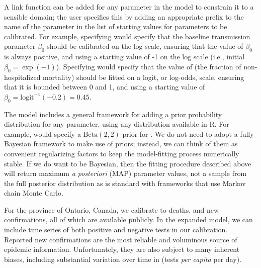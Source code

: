 \documentclass[12pt]{article}\usepackage[]{graphicx}\usepackage[]{color}
\begin{document}
A link function can be added for any parameter in the model to constrain it to a sensible domain; the user specifies this by adding an appropriate prefix to the name of the parameter in the list of starting values for parameters to be calibrated. 
For example, specifying  would specify that the baseline transmission parameter $\beta_0$ should be calibrated on the log scale, ensuring that the value of $\beta_0$ is always positive, and using a starting value of -1 on the log scale (i.e., initial $\beta_0 = \exp(-1)$). 
Specifying  would specify that the value of  (the fraction of non-hospitalized mortality) should be fitted on a logit, or log-odds, scale, ensuring that it is bounded between 0 and 1, and using a starting value of $\beta_0 = \textrm{logit}^{-1}(-0.2) = 0.45$.

The model includes a general framework for adding a prior probability distribution for any parameter, using any distribution available in R. 
For example,  would specify a $\textrm{Beta}(2,2)$ prior for .
We do not need to adopt a fully Bayesian framework to make use of priors; instead, we can think of them as convenient regularizing factors to keep the model-fitting process numerically stable. If we do want to be Bayesian, then the fitting procedure described above will return maximum \emph{a posteriori} (MAP) parameter values, not a sample from the full posterior distribution as is standard with frameworks that use Markov chain Monte Carlo.

For the province of Ontario, Canada,
we calibrate to deaths, and new confirmations, all of which are available publicly. 
In the expanded model, we can include time series of both positive and negative tests in our calibration. 
Reported new confirmations are the most reliable and voluminous source of epidemic information.
Unfortunately, they are also subject to many inherent biases, including substantial variation over time in  (\ie tests \emph{per capita} per day).
\end{document}
